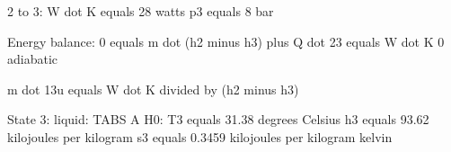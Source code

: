 2 to 3:
W dot K equals 28 watts
p3 equals 8 bar

Energy balance:
0 equals m dot (h2 minus h3) plus Q dot 23 equals W dot K
0 adiabatic

m dot 13u equals W dot K divided by (h2 minus h3)

State 3: liquid: TABS A H0: T3 equals 31.38 degrees Celsius
h3 equals 93.62 kilojoules per kilogram
s3 equals 0.3459 kilojoules per kilogram kelvin